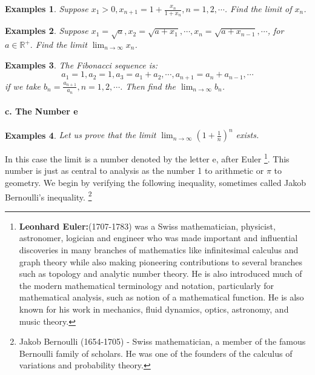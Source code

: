 \documentclass[a4paper,12pt]{article} %
\newtheorem{example}{Examples}
\begin{document}
\begin{example}
    \emph{Suppose} $x_1 > 0, x_{n+1} = 1+\frac{x_n}{1+x_n}, n = 1,2,\cdots$.
    \emph{Find the limit of} $x_n$.
\end{example}

\begin{example}
    \emph{Suppose} $x_1 = \sqrt{a}, x_2 = \sqrt{a+x_1}, \cdots, x_n = \sqrt{a + x_{n-1}}, \cdots$, 
    for $a \in \mathbb{R}^+.$
    \emph{Find the limit} $\lim_{n \to \infty} x_n$.
\end{example}

\begin{example}
    \emph{The Fibonacci sequence is: }
    \[
        a_1 = 1, a_2 = 1, a_3 = a_1 + a_2, \cdots, a_{n+1} = a_n + a_{n-1}, \cdots
        \]
    \emph{if we take }
    $\displaystyle b_n = \frac{a_{n+1}}{a_n}, n = 1,2,\cdots$.
    \emph{Then find the} $\displaystyle \lim_{n \to \infty} b_n$.
\end{example}

\paragraph{{\rm \textbf{c. The Number e }}}
\begin{example}
    Let us prove that the limit $\displaystyle \lim_{n \to \infty}\left(1+\frac{1}{n}\right)^n $ exists.
\end{example}
In this case the limit is a number denoted by the letter e, after Euler
\footnote{\textbf{Leonhard Euler:}(1707-1783) was a Swiss mathematician, 
physicist, astronomer, logician and engineer who was made important and 
influential discoveries in many branches of mathematics like infinitesimal 
calculus and graph theory while also making pioneering contributions to 
several branches such as topology and analytic number theory. He is also
introduced much of the modern mathematical terminology and notation, particularly 
for mathematical analysis, such as notion of a mathematical function. He is also 
known for his work in mechanics, fluid dynamics, optics, astronomy, and music theory.}.
This number is just as central to analysis as the number 1 to arithmetic 
or $\pi$ to geometry. We begin by verifying the following inequality, 
sometimes called Jakob Bernoulli's inequality. \footnote{Jakob Bernoulli 
(1654-1705) - Swiss mathematician, a member of the famous Bernoulli 
family of scholars. He was one of the founders of the calculus of 
variations and probability theory.}
\end{document}
